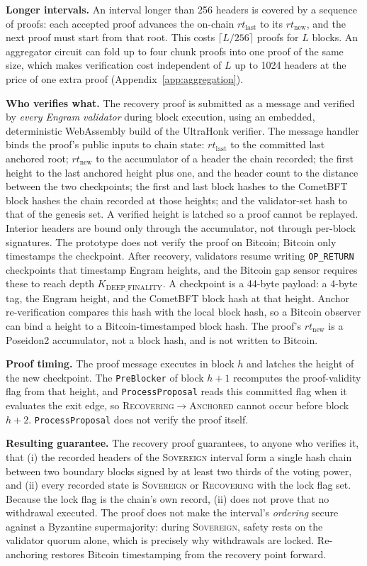 \textbf{Longer intervals.} An interval longer than 256 headers is covered by
a sequence of proofs: each accepted proof advances the on-chain
$\mathit{rt}_{\text{last}}$ to its $\mathit{rt}_{\text{new}}$, and the next
proof must start from that root. This costs $\lceil L/256 \rceil$ proofs for
$L$ blocks. An aggregator circuit can fold up to four chunk proofs into one
proof of the same size, which makes verification cost independent of $L$ up to
1024 headers at the price of one extra proof
(Appendix~\ref{app:aggregation}).

\textbf{Who verifies what.} The recovery proof is submitted as a message and
verified by \emph{every Engram validator} during block execution, using an
embedded, deterministic WebAssembly build of the UltraHonk verifier. The
message handler binds the proof's public inputs to chain state:
$\mathit{rt}_{\text{last}}$ to the committed last anchored root;
$\mathit{rt}_{\text{new}}$ to the accumulator of a header the chain recorded;
the first height to the last anchored height plus one, and the header count
to the distance between the two checkpoints; the first and last block hashes
to the CometBFT block hashes the chain recorded at those heights; and the
validator-set hash to that of the genesis set. A verified height is latched so
a proof cannot be replayed. Interior headers are bound only through the
accumulator, not through per-block signatures. The prototype does not verify
the proof on Bitcoin; Bitcoin only timestamps the checkpoint. After recovery,
validators resume writing \texttt{OP\_RETURN} checkpoints that timestamp
Engram heights, and the Bitcoin gap sensor requires these to reach depth
$K_{\text{DEEP\_FINALITY}}$. A checkpoint is a 44-byte payload: a 4-byte tag,
the Engram height, and the CometBFT block hash at that height. Anchor
re-verification compares this hash with the local block hash, so a Bitcoin
observer can bind a height to a Bitcoin-timestamped block hash. The proof's
$\mathit{rt}_{\text{new}}$ is a Poseidon2 accumulator, not a block hash, and
is not written to Bitcoin.

\textbf{Proof timing.} The proof message executes in block $h$ and latches the
height of the new checkpoint. The \texttt{PreBlocker} of block $h{+}1$
recomputes the proof-validity flag from that height, and
\texttt{ProcessProposal} reads this committed flag when it evaluates the exit
edge, so \textsc{Recovering}$\to$\textsc{Anchored} cannot occur before block
$h{+}2$.
\texttt{ProcessProposal} does not verify the proof itself.

\textbf{Resulting guarantee.} The recovery proof guarantees, to anyone who
verifies it, that (i) the recorded headers of the \textsc{Sovereign} interval
form a single hash chain between two boundary blocks signed by at least two
thirds of the voting power, and (ii) every recorded state is
\textsc{Sovereign} or \textsc{Recovering} with the lock flag set. Because the
lock flag is the chain's own record, (ii) does not prove that no withdrawal
executed. The proof does not make the interval's \emph{ordering} secure
against a Byzantine supermajority: during \textsc{Sovereign}, safety rests on
the validator quorum alone, which is precisely why withdrawals are locked.
Re-anchoring restores Bitcoin timestamping from the recovery point forward.

